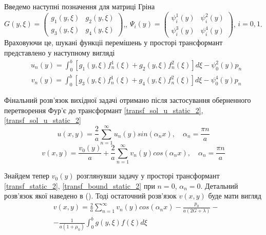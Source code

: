 Введемо наступні позначення для матриці Гріна $G(y, \xi) = \begin{pmatrix}
    g_1(y,\xi) & g_2(y,\xi) \\
    g_3(y,\xi) & g_4(y,\xi)
\end{pmatrix}$,, $\Psi_i(y) = \begin{pmatrix}
    \psi_i^1(y) & \psi_i^2(y) \\
    \psi_i^3(y) & \psi_i^4(y)
\end{pmatrix}$, $i=0,1$.
Враховуючи це, шукані функціі перемішень у просторі трансформант представлено у наступному вигляді
\begin{align}\label{transf_sol_u_static_2}
    &u_n(y) = \int_0^b \left[g_1(y, \xi)f_n^1(\xi) + g_2(y, \xi)f_n^2(\xi) \right]d\xi - \psi_0^2(y) p_n
\end{align}
\begin{align}\label{transf_sol_v_static_2}
    &v_n(y) = \int_0^b \left[g_3(y, \xi)f_n^1(\xi) + g_4(y, \xi)f_n^2(\xi) \right]d\xi - \psi_0^4(y) p_n
\end{align}

Фінальний розв'язок вихідної задачі отримано після застосування оберненного перетворення Фур'є до трансформант \eqref{transf_sol_u_static_2}, \eqref{transf_sol_u_static_2}
\begin{equation}
    u(x,y) = \frac{2}{a} \sum_{n=1}^{\infty} u_n(y) sin(\alpha_n x), \quad \alpha_n = \frac{\pi n}{a}
\end{equation}
\begin{equation}
    v(x,y) = \frac{v_0(y)}{a} + \frac{2}{a} \sum_{n=1}^{\infty} v_n(y) cos(\alpha_n x), \quad \alpha_n = \frac{\pi n}{a}
\end{equation}

Знайдем тепер $v_0(y)$ розглянувши задачу у просторі трансформант \eqref{transf_static_2}, \eqref{transf_bound_static_2} при $n=0$, $\alpha_n = 0$.
Детальний розв'язок якої наведено в (). Тоді остаточний розв'язок $v(x,y)$ буде мати вигляд
\begin{align}
    &v(x,y) = \frac{2}{a} \sum_{n=1}^{\infty} v_n(y) cos(\alpha_n x) - \frac{p_0}{a(2G + \lambda)} - \\
    &- \frac{1}{a(1+\mu_0)} \int_{0}^{b}g(y,\xi) f(\xi) d\xi
\end{align}

